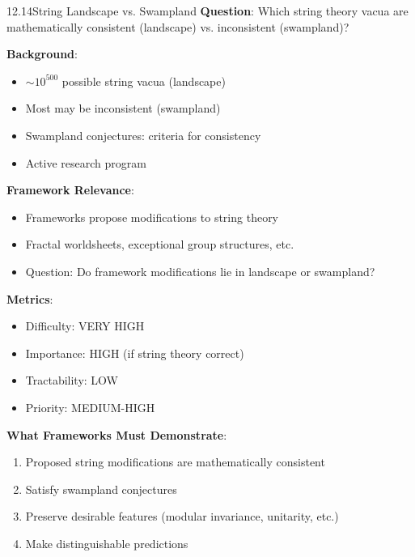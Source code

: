 \begin{openproblem}{12.14}{String Landscape vs. Swampland}
\textbf{Question}: Which string theory vacua are mathematically consistent (landscape) vs. inconsistent (swampland)?

\textbf{Background}:
\begin{itemize}
    \item $\sim 10^{500}$ possible string vacua (landscape)
    \item Most may be inconsistent (swampland)
    \item Swampland conjectures: criteria for consistency
    \item Active research program
\end{itemize}

\textbf{Framework Relevance}:
\begin{itemize}
    \item Frameworks propose modifications to string theory
    \item Fractal worldsheets, exceptional group structures, etc.
    \item Question: Do framework modifications lie in landscape or swampland?
\end{itemize}

\textbf{Metrics}:
\begin{itemize}
    \item Difficulty: VERY HIGH
    \item Importance: HIGH (if string theory correct)
    \item Tractability: LOW
    \item Priority: MEDIUM-HIGH
\end{itemize}

\textbf{What Frameworks Must Demonstrate}:
\begin{enumerate}
    \item Proposed string modifications are mathematically consistent
    \item Satisfy swampland conjectures
    \item Preserve desirable features (modular invariance, unitarity, etc.)
    \item Make distinguishable predictions
\end{enumerate}
\end{openproblem}

